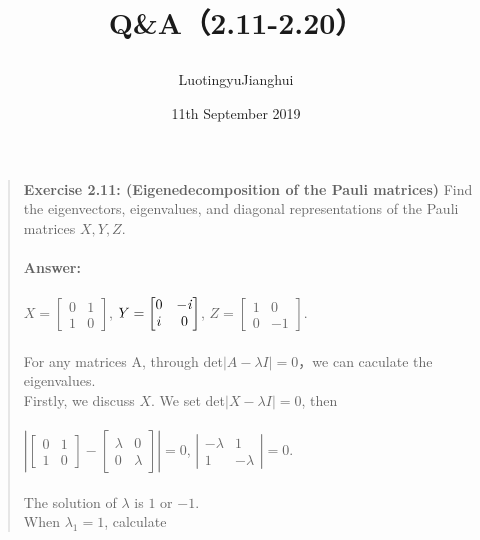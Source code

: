 \documentclass[UTF8]{ctexart}
\begin{document}
	\title{\textbf{Q\&A（2.11-2.20）}\\[1ex]\begin{large}
		\end{large}}
	\author{Luotingyu\quad Jianghui}
	\date{11th September 2019 }
	\maketitle
\begin{quote}
\textbf{Exercise 2.11: (Eigenedecomposition of the Pauli matrices)} Find the eigenvectors, eigenvalues, and diagonal representations of the Pauli matrices $X, Y, Z$. \\ \\
\textbf{Answer:}\\ \\
	$X=\begin{bmatrix}0& 1\\1& 0\end{bmatrix}$,	
	$Y=\begin{bmatrix}0& -\it{i}\\i&0\end{bmatrix}$,
	$Z=\begin{bmatrix}1& 0\\0&-1\end{bmatrix}$.\\ \\
	 For any matrices A, through  det$|A-\lambda I|=0$，we can caculate the eigenvalues. \\
	Firstly, we discuss $X$. We set det$|X-\lambda I|=0$, then \\ \\ 
	$\left|\begin{bmatrix}0& 1\\1& 0\end{bmatrix} - \begin{bmatrix}\lambda& 0\\0& \lambda\end{bmatrix}\right|=0$,
	$\left|\begin{array}{cccc} -\lambda& 1\\1&-\lambda \end{array}\right| =0. $ \\  \\
	The solution of $\lambda$  is $1$ or $-1$.\\
	When $\lambda_{1}=1$, calculate 

\end{quote}
\end{document}
